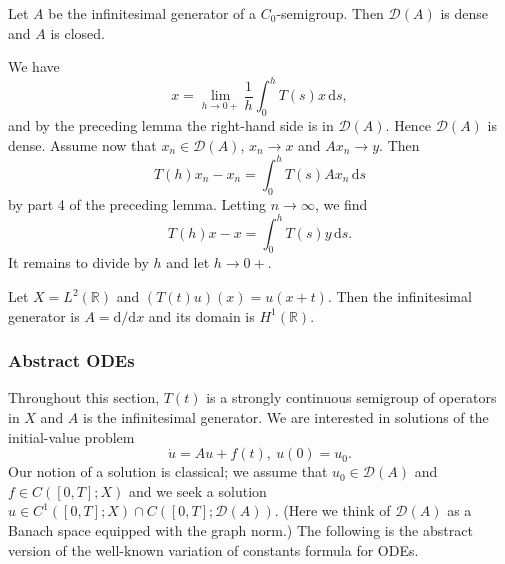 \begin{Theorem}
\label{thm:semigroup-generator-dense-closed}
Let $A$ be the infinitesimal generator of a $C_0$-semigroup. Then $\mathcal{D}(A)$ is dense and $A$ is closed.
\end{Theorem}

\begin{Proof}
We have
\begin{equation}\label{eq:semigroup-generator-domain-dense-average-approximation}
x=\lim_{h\to0+}\dfrac{1}{h}\int_0^h T(s)x\,\mathrm{d}s,
\end{equation}
and by the preceding lemma the right-hand side is in $\mathcal{D}(A)$. Hence $\mathcal{D}(A)$ is dense. Assume now that $x_n\in\mathcal{D}(A)$, $x_n\to x$ and $Ax_n\to y$. Then
\begin{equation}\label{eq:semigroup-generator-closedness-sequence-identity}
T(h)x_n-x_n=\int_0^h T(s)Ax_n\,\mathrm{d}s
\end{equation}
by part 4 of the preceding lemma. Letting $n\to\infty$, we find
\begin{equation}\label{eq:semigroup-generator-closedness-limit-identity}
T(h)x-x=\int_0^h T(s)y\,\mathrm{d}s.
\end{equation}
It remains to divide by $h$ and let $h\to0+$.
\end{Proof}

\begin{Example}
\label{ex:ltwo-translation-generator}
Let $X=L^2(\mathbb{R})$ and $(T(t)u)(x)=u(x+t)$. Then the infinitesimal generator is $A=\mathrm{d}/\mathrm{d}x$ and its domain is $H^1(\mathbb{R})$.
\end{Example}

\subsubsection{Abstract ODEs}\label{subsec:semigroup-abstract-odes}

Throughout this section, $T(t)$ is a strongly continuous semigroup of operators in $X$ and $A$ is the infinitesimal generator. We are interested in solutions of the initial-value problem
\begin{equation}\label{eq:semigroup-abstract-inhomogeneous-initial-value-problem}
\dot u=Au+f(t),\ u(0)=u_0.
\end{equation}
Our notion of a solution is classical; we assume that $u_0\in\mathcal{D}(A)$ and $f\in C([0,T];X)$ and we seek a solution $u\in C^1([0,T];X)\cap C([0,T];\mathcal{D}(A))$. (Here we think of $\mathcal{D}(A)$ as a Banach space equipped with the graph norm.) The following is the abstract version of the well-known variation of constants formula for ODEs.

